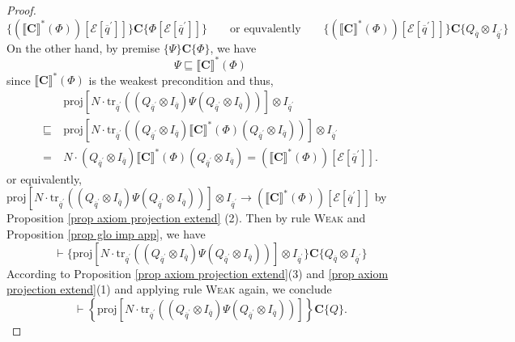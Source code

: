 \documentclass[conference,compsoc, 10pt]{IEEEtran}
\newcommand {\qbar} {{\overline{q}}}
\newcommand {\cE } {{\mathcal{E}}}
\newcommand {\id } {{I}}
\newcommand {\tr } {{\mathrm{tr}}}
\newcommand {\prog } {{\mathbf{C}}}
\newcommand {\sem}[1] {\llbracket#1\rrbracket}
\newcommand{\proj}{{\mathrm{proj}}}
\begin{document}
\begin{appendices}
\begin{proof}
			$$\{(\sem{\prog}^\ast(\Phi))[\cE[\qbar^\prime]]\}\prog\{\Phi[\cE[\qbar^\prime]]\}\qquad\text{or equvalently}\qquad
			\{(\sem{\prog}^\ast(\Phi))[\cE[\qbar^\prime]]\}\prog\{Q_\qbar\otimes\id_{\qbar^\prime}\}
			$$
			On the other hand, by premise $\{\Psi\}\prog\{\Phi\}$, we have
			$$\Psi\sqsubseteq\sem{\prog}^\ast(\Phi)$$
			since $\sem{\prog}^\ast(\Phi)$ is the weakest precondition and thus,
			\begin{align*}
			&\proj\left[N\cdot\tr_{\qbar^\prime}\left((Q_{\qbar^\prime}\otimes\id_{\qbar})\Psi(Q_{\qbar^\prime}\otimes\id_{\qbar})\right)\right]\otimes\id_{\qbar^\prime} \\
			\sqsubseteq\ & \proj\left[N\cdot\tr_{\qbar^\prime}\left((Q_{\qbar^\prime}\otimes\id_{\qbar})\sem{\prog}^\ast(\Phi)(Q_{\qbar^\prime}\otimes\id_{\qbar})\right)\right]\otimes\id_{\qbar^\prime} \\
			=\ & N\cdot(Q_{\qbar^\prime}\otimes\id_{\qbar})\sem{\prog}^\ast(\Phi)(Q_{\qbar^\prime}\otimes\id_{\qbar}) = (\sem{\prog}^\ast(\Phi))[\cE[\qbar^\prime]].
			\end{align*}
			or equivalently, $\proj\left[N\cdot\tr_{\qbar^\prime}\left((Q_{\qbar^\prime}\otimes\id_{\qbar})\Psi(Q_{\qbar^\prime}\otimes\id_{\qbar})\right)\right]\otimes\id_{\qbar^\prime}\rightarrow(\sem{\prog}^\ast(\Phi))[\cE[\qbar^\prime]]$ by Proposition \ref{prop axiom projection extend} (2). Then by rule \textsc{Weak} and Proposition \ref{prop glo imp app}, we have
			$$\vdash \{\proj\left[N\cdot\tr_{\qbar^\prime}\left((Q_{\qbar^\prime}\otimes\id_{\qbar})\Psi(Q_{\qbar^\prime}\otimes\id_{\qbar})\right)\right]\otimes\id_{\qbar^\prime}\}\prog\{Q_\qbar\otimes\id_{\qbar^\prime}\}$$
			According to Proposition \ref{prop axiom projection extend}(3) and \ref{prop axiom projection extend}(1) and applying
			rule \textsc{Weak} again, we conclude $$\vdash\left\{\proj\left[N\cdot\tr_{\qbar^\prime}\left((Q_{\qbar^\prime}\otimes\id_{\qbar})\Psi(Q_{\qbar^\prime}\otimes\id_{\qbar})\right)\right]\right\}\prog\{Q\}.$$
		\end{proof}
		

\end{appendices}
\end{document}
